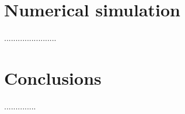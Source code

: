 \documentclass[a4paper,11pt,bibliography=totoc,listof=totoc,headinclude=true,cleardoublepage=empty,oneside]{scrbook}
\newcommand{\dffv}{\Tilde{\beta}_{\Vec{\alpha}}}
\newcommand{\e}{\mathrm{end}}
\begin{document}

\chapter{Numerical simulation}
.......................

\chapter{Conclusions}
..............

 
%

\end{document}

